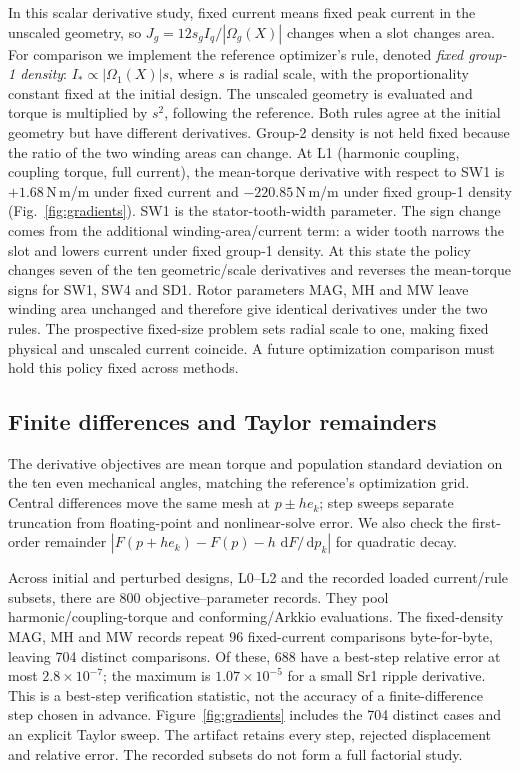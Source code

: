\documentclass{anvil-paper}
\newcommand{\dd}{\,\mathrm{d}}
\begin{document}
In this scalar derivative study, fixed current means fixed peak current
in the unscaled geometry, so
$J_g=12s_g I_q/|\Omega_g(X)|$ changes when a slot changes area.
For comparison we implement the reference optimizer's rule, denoted
\emph{fixed group-1 density}: $I_*\propto |\Omega_1(X)|s$, where $s$ is
radial scale, with the proportionality constant fixed at the initial
design. The unscaled geometry is evaluated and torque is multiplied by
$s^2$, following the reference. Both rules agree at the initial geometry
but have different derivatives. Group-2 density is not held fixed because
the ratio of the two winding areas can change. At L1 (harmonic coupling,
coupling torque, full current), the mean-torque derivative with respect to SW1 is
$+1.68$\,N\,m/m under fixed current and $-220.85$\,N\,m/m under fixed
group-1 density (Fig.~\ref{fig:gradients}). SW1 is the stator-tooth-width
parameter. The sign change comes from the additional winding-area/current
term: a wider tooth narrows the slot and lowers current under fixed
group-1 density. At this state the policy changes seven of the ten
geometric/scale derivatives and reverses the mean-torque signs for SW1,
SW4 and SD1. Rotor parameters MAG, MH and MW leave winding area unchanged
and therefore give identical derivatives under the two rules. The prospective
fixed-size problem sets radial scale to one, making fixed physical and
unscaled current coincide. A future
optimization comparison must hold this policy fixed across methods.

\subsection{Finite differences and Taylor remainders}
The derivative objectives are mean torque and population standard
deviation on the ten even mechanical angles, matching the reference's
optimization grid. Central differences move the same mesh at $p\pm h e_k$;
step sweeps separate truncation from floating-point and nonlinear-solve
error. We also check the first-order remainder
$|F(p+h e_k)-F(p)-h\,\dd F/\dd p_k|$ for quadratic decay.

Across initial and perturbed designs, L0--L2 and the recorded loaded
current/rule subsets, there are 800 objective--parameter records. They pool
harmonic/coupling-torque and conforming/Arkkio evaluations. The fixed-density
MAG, MH and MW records repeat 96 fixed-current comparisons byte-for-byte,
leaving 704 distinct comparisons. Of these, 688 have a best-step relative
error at most $2.8\times10^{-7}$; the maximum is $1.07\times10^{-5}$ for
a small Sr1 ripple derivative. This is a best-step verification statistic,
not the accuracy of a finite-difference step chosen in advance.
Figure~\ref{fig:gradients} includes the 704 distinct cases and an explicit
Taylor sweep. The artifact retains every step, rejected displacement and
relative error. The recorded subsets do not form a full factorial study.
\end{document}
